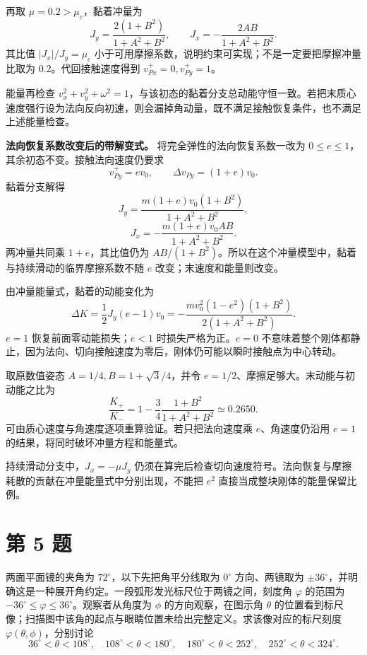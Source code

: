 \documentclass[12pt,a4paper,UTF8]{ctexart}
\begin{document}
再取 \(\mu=0.2>\mu_c\)，黏着冲量为 \[
J_y=\frac{2(1+B^2)}{1+A^2+B^2},\qquad
J_x=-\frac{2AB}{1+A^2+B^2}.
\] 其比值 \(|J_x|/J_y=\mu_c\)
小于可用摩擦系数，说明约束可实现；不是一定要把摩擦冲量比取为
\(0.2\)。代回接触速度得到 \(v_{Px}^+=0,v_{Py}^+=1\)。

能量再检查
\(v_x^2+v_y^2+\omega^2=1\)，与该初态的黏着分支总动能守恒一致。若把末质心速度强行设为法向反向初速，则会漏掉角动量，既不满足接触恢复条件，也不满足上述能量检查。

\textbf{法向恢复系数改变后的带解变式。} 将完全弹性的法向恢复系数一改为
\(0\le e\le1\)，其余初态不变。接触法向速度仍要求 \[
v_{Py}^+=ev_0,\qquad
\Delta v_{Py}=(1+e)v_0.
\] 黏着分支解得 \[
J_y=\frac{m(1+e)v_0(1+B^2)}{1+A^2+B^2},
\] \[
J_x=-\frac{m(1+e)v_0AB}{1+A^2+B^2}.
\] 两冲量共同乘 \(1+e\)，其比值仍为
\(AB/(1+B^2)\)。所以在这个冲量模型中，黏着与持续滑动的临界摩擦系数不随
\(e\) 改变；末速度和能量则改变。

由冲量能量式，黏着的动能变化为 \[
\Delta K=\frac12J_y(e-1)v_0
=-\frac{mv_0^2(1-e^2)(1+B^2)}{2(1+A^2+B^2)}.
\] \(e=1\) 恢复前面零动能损失；\(e<1\) 时损失严格为正。\(e=0\)
不意味着整个刚体都静止，因为法向、切向接触速度为零后，刚体仍可能以瞬时接触点为中心转动。

取原数值姿态 \(A=1/4,B=1+\sqrt3/4\)，并令
\(e=1/2\)、摩擦足够大。末动能与初动能之比为 \[
\frac{K_+}{K_-}=1-
\frac34\frac{1+B^2}{1+A^2+B^2}\simeq0.2650.
\] 可由质心速度与角速度逐项重算验证。若只把法向速度乘
\(e\)、角速度仍沿用 \(e=1\) 的结果，将同时破坏冲量方程和能量式。

持续滑动分支中，\(J_x=-\mu J_y\)
仍须在算完后检查切向速度符号。法向恢复与摩擦耗散的贡献在冲量能量式中分别出现，不能把
\(e^2\) 直接当成整块刚体的能量保留比例。

\newpage

\section{第 5 题}\label{ux7b2c-5-ux9898}

两面平面镜的夹角为 \(72^\circ\)，以下先把角平分线取为 \(0^\circ\)
方向、两镜取为
\(\pm36^\circ\)，并明确这是一种展开角约定。一段弧形发光标尺位于两镜之间，刻度角
\(\varphi\) 的范围为 \(-36^\circ\le\varphi\le36^\circ\)。观察者从角度为
\(\phi\) 的方向观察，在图示角 \(\theta\)
的位置看到标尺像；扫描图中该角的起点与眼睛位置未给出完整定义。求该像对应的标尺刻度
\(\varphi(\theta,\phi)\)，分别讨论 \[
36^\circ<\theta<108^\circ,\quad
108^\circ<\theta<180^\circ,\quad
180^\circ<\theta<252^\circ,\quad
252^\circ<\theta<324^\circ.
\]
\end{document}
